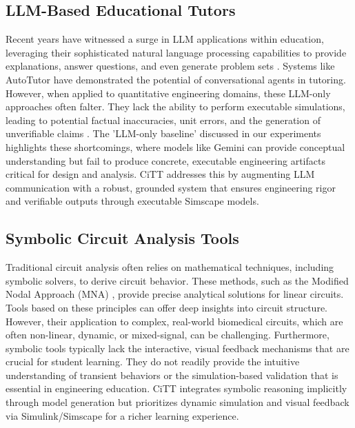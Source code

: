 \documentclass[10pt,twocolumn,letterpaper]{article}
\begin{document}
\subsection{LLM-Based Educational Tutors}
Recent years have witnessed a surge in LLM applications within education, leveraging their sophisticated natural language processing capabilities to provide explanations, answer questions, and even generate problem sets \cite{gemini_api_docs}. Systems like AutoTutor \cite{graesser_autotutor_2001} have demonstrated the potential of conversational agents in tutoring. However, when applied to quantitative engineering domains, these LLM-only approaches often falter. They lack the ability to perform executable simulations, leading to potential factual inaccuracies, unit errors, and the generation of unverifiable claims \cite{llm_math_reasoning_survey}. The 'LLM-only baseline' discussed in our experiments highlights these shortcomings, where models like Gemini can provide conceptual understanding but fail to produce concrete, executable engineering artifacts critical for design and analysis. CiTT addresses this by augmenting LLM communication with a robust, grounded system that ensures engineering rigor and verifiable outputs through executable Simscape models.

\subsection{Symbolic Circuit Analysis Tools}
Traditional circuit analysis often relies on mathematical techniques, including symbolic solvers, to derive circuit behavior. These methods, such as the Modified Nodal Approach (MNA) \cite{ho_mna_1975}, provide precise analytical solutions for linear circuits. Tools based on these principles can offer deep insights into circuit structure. However, their application to complex, real-world biomedical circuits, which are often non-linear, dynamic, or mixed-signal, can be challenging. Furthermore, symbolic tools typically lack the interactive, visual feedback mechanisms that are crucial for student learning. They do not readily provide the intuitive understanding of transient behaviors or the simulation-based validation that is essential in engineering education. CiTT integrates symbolic reasoning implicitly through model generation but prioritizes dynamic simulation and visual feedback via Simulink/Simscape for a richer learning experience.
\end{document}
